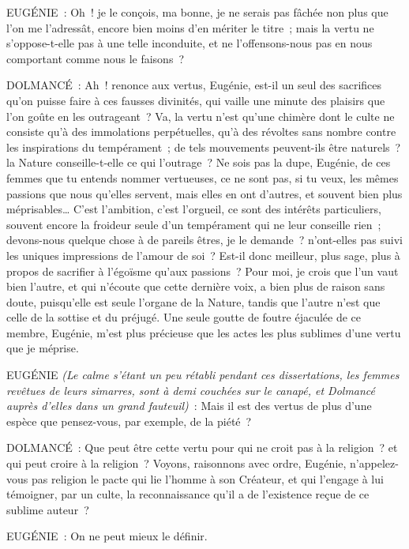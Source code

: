 \documentclass[french,twoside]{book} %
\begin{document}
EUGÉNIE : Oh ! je le conçois, ma bonne, je ne serais pas fâchée non plus que l’on me l’adressât, encore bien moins d’en mériter le titre ; mais la vertu ne s’oppose-t-elle pas à une telle inconduite, et ne l’offensons-nous pas en nous comportant comme nous le faisons ?\par
DOLMANCÉ : Ah ! renonce aux vertus, Eugénie, est-il un seul des sacrifices qu’on puisse faire à ces fausses divinités, qui vaille une minute des plaisirs que l’on goûte en les outrageant ? Va, la vertu n’est qu’une chimère dont le culte ne consiste qu’à des immolations perpétuelles, qu’à des révoltes sans nombre contre les inspirations du tempérament ; de tels mouvements peuvent-ils être naturels ? la Nature conseille-t-elle ce qui l’outrage ? Ne sois pas la dupe, Eugénie, de ces femmes que tu entends nommer vertueuses, ce ne sont pas, si tu veux, les mêmes passions que nous qu’elles servent, mais elles en ont d’autres, et souvent bien plus méprisables… C’est l’ambition, c’est l’orgueil, ce sont des intérêts particuliers, souvent encore la froideur seule d’un tempérament qui ne leur conseille rien ; devons-nous quelque chose à de pareils êtres, je le demande ? n’ont-elles pas suivi les uniques impressions de l’amour de soi ? Est-il donc meilleur, plus sage, plus à propos de sacrifier à l’égoïsme qu’aux passions ? Pour moi, je crois que l’un vaut bien l’autre, et qui n’écoute que cette dernière voix, a bien plus de raison sans doute, puisqu’elle est seule l’organe de la Nature, tandis que l’autre n’est que celle de la sottise et du préjugé. Une seule goutte de foutre éjaculée de ce membre, Eugénie, m’est plus précieuse que les actes les plus sublimes d’une vertu que je méprise.\par
EUGÉNIE {\itshape (Le calme s’étant un peu rétabli pendant ces dissertations, les femmes revêtues de leurs simarres, sont à demi couchées sur le canapé, et Dolmancé auprès d’elles dans un grand fauteuil)} : Mais il est des vertus de plus d’une espèce que pensez-vous, par exemple, de la piété ?\par
DOLMANCÉ : Que peut être cette vertu pour qui ne croit pas à la religion ? et qui peut croire à la religion ? Voyons, raisonnons avec ordre, Eugénie, n’appelez-vous pas religion le pacte qui lie l’homme à son Créateur, et qui l’engage à lui témoigner, par un culte, la reconnaissance qu’il a de l’existence reçue de ce sublime auteur ?\par
EUGÉNIE : On ne peut mieux le définir.\par
\end{document}
